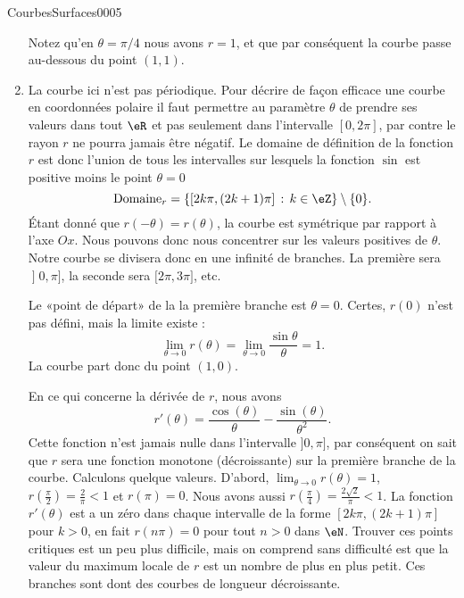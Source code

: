 \begin{corrige}{CourbesSurfaces0005}
\begin{enumerate}
			Notez qu'en $\theta=\pi/4$ nous avons $r=1$, et que par conséquent la courbe passe au-dessous du point $(1,1)$.
		\item
		  La courbe ici n'est pas périodique. Pour décrire de façon efficace une courbe en coordonnées polaire il faut permettre au paramètre $\theta$ de prendre ses valeurs dans tout $\eR$ et pas seulement dans l'intervalle $[0,2\pi]$, par contre le rayon $r$ ne pourra jamais être négatif. Le domaine de définition de la fonction $r$ est donc l'union de tous les intervalles sur lesquels la fonction $\sin$ est positive moins le point $\theta=0$
                  \begin{equation}
                    \textrm{Domaine}_r=\{[2k\pi, (2k+1)\pi]\,:\, k\in\eZ\}\setminus\{0\}.
                  \end{equation}
			Étant donné que $r(-\theta)=r(\theta)$, la courbe est symétrique par rapport à l'axe $Ox$. Nous pouvons donc nous concentrer sur les valeurs positives de $\theta$. Notre courbe se divisera donc en une infinité de branches. La première sera \( \mathopen] 0 , \pi \mathclose]\), la seconde sera \( \mathopen[ 2\pi , 3\pi \mathclose]\), etc.
            
            Le «point de départ» de la la première branche est \( \theta=0\). Certes, \( r(0)\) n'est pas défini, mais la limite existe :
            \begin{equation}
                \lim_{\theta\to 0} r(\theta)=\lim_{\theta\to 0} \frac{ \sin\theta }{ \theta }=1.
            \end{equation}
            La courbe part donc du point \( (1,0)\).

            
            
            
            En ce qui concerne la dérivée de $r$, nous avons
			\begin{equation}
				r'(\theta)=\frac{ \cos(\theta) }{ \theta }-\frac{ \sin(\theta) }{ \theta^2 }.
			\end{equation}
                        Cette fonction n'est jamais nulle dans l'intervalle $]0,\pi]$, par conséquent on sait que $r$ sera une fonction monotone (décroissante) sur la première branche de la courbe.  Calculons quelque valeurs. D'abord, $\lim_{\theta\to 0}r(\theta)=1$, $r(\frac{ \pi }{2})=\frac{ 2 }{ \pi }<1$ et $r(\pi)=0$. Nous avons aussi $r(\frac{ \pi }{ 4 })=\frac{ 2\sqrt{2} }{ \pi }<1$.
		        La fonction $r'(\theta)$ est a un zéro dans chaque intervalle de la forme $[2k\pi, (2k+1)\pi]$ pour $k>0$, en fait $r(n\pi)=0$ pour tout $n>0$ dans $\eN$. Trouver ces points critiques est un peu plus difficile, mais on comprend sans difficulté est que la valeur du maximum locale de $r$ est un nombre de plus en plus petit. Ces branches sont dont des courbes de longueur décroissante.  


\end{enumerate}
\end{corrige}
